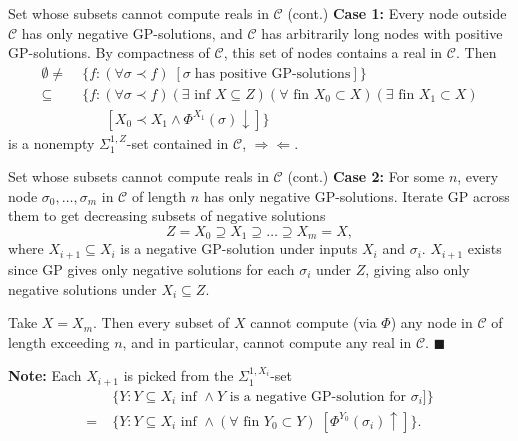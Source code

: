 \begin{frame}{Set whose subsets cannot compute reals in $\mathcal{C}$
(cont.)}
  \textbf{Case 1:} Every node outside $\mathcal{C}$ has only negative
  GP-solutions, and $\mathcal{C}$ has arbitrarily long nodes with
  positive GP-solutions. By compactness of $\mathcal{C}$, this set of
  nodes contains a real in $\mathcal{C}$. Then
  \begin{align*}
    \emptyset\neq\; &\{f:(\forall \sigma\prec f)\; [\sigma\; \text{has
    positive GP-solutions}]\}\\
    \subseteq\; &\{f:(\forall \sigma\prec f) (\exists \text{ inf }
    X\subseteq Z) (\forall \text{ fin } X_0\subset X) (\exists \text{ fin }
    X_1\subset X)\\ &\;\;\;\;\;\;[X_0 \prec X_1 \wedge
    \Phi^{X_1}(\sigma)\downarrow]\}
  \end{align*}
  is a nonempty $\Sigma_1^{1,Z}$-set contained
  in $\mathcal{C}$, $\Rightarrow\Leftarrow$.
\end{frame}

\begin{frame}{Set whose subsets cannot compute reals in $\mathcal{C}$
(cont.)}
  \textbf{Case 2:} For some $n$, every node $\sigma_0,\ldots,\sigma_m$ in
  $\mathcal{C}$ of length $n$ has only negative GP-solutions. Iterate GP
  across them to get decreasing subsets of negative solutions
  \[Z=X_0 \supseteq X_1 \supseteq \ldots\supseteq X_m=X,\]
  where $X_{i+1}\subseteq X_i$ is a negative GP-solution under inputs
  $X_i$ and $\sigma_i$. $X_{i+1}$ exists since GP gives only negative
  solutions for each $\sigma_i$ under $Z$, giving also only negative
  solutions under $X_i\subseteq Z$.

  \vspace{0.5em}
  Take $X=X_m$. Then every subset of $X$ cannot compute (via $\Phi$) any
  node in $\mathcal{C}$ of length exceeding $n$, and in particular,
  cannot compute any real in $\mathcal{C}$. $\blacksquare$

  \vspace{0.5em}
  \textbf{Note:} Each $X_{i+1}$ is picked from the $\Sigma^{1,X_i}_1$-set
  \begin{align*}
    &\{Y:Y\subseteq X_i \text{ inf } \wedge Y \text{ is a
    negative GP-solution for } \sigma_i]\}\\
    =\;&\{Y:Y\subseteq X_i \text{ inf } \wedge (\forall \text{ fin }
    Y_0\subset Y)\; [\Phi^{Y_0}(\sigma_i)\uparrow]\}.
  \end{align*}
\end{frame}

